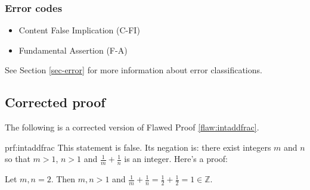 \subsubsection{Error codes}
\begin{itemize}
	\item   Content False Implication (C-FI)
	\item   Fundamental Assertion (F-A)
\end{itemize}
See Section \ref{sec-error} for more information about error classifications.

\clearpage
\subsection{Corrected proof}

The following is a corrected version of Flawed Proof \ref{flaw:intaddfrac}. 

\begin{prf}{prf:intaddfrac} 
This statement is false. Its negation is: there exist integers $m$ and $n$ so that $m>1$, $n>1$ and $\frac1m + \frac1n$ is an integer. Here's a proof:

Let $m,n = 2$. Then $m,n > 1$ and $\frac1m+ \frac1n = \frac12 + \frac12 = 1 \in \mathbb{Z}.$
\end{prf} 
